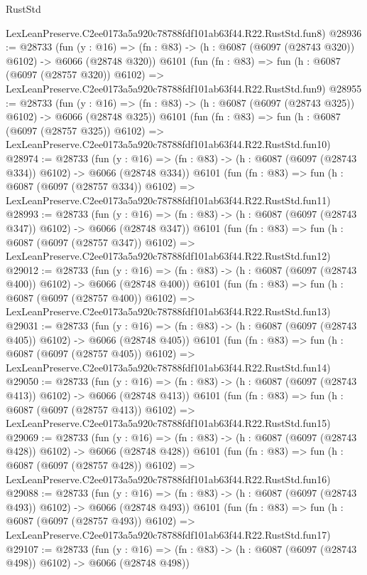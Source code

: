 \begin{lexlean}{RustStd}
\begin{coremodule}
    LexLeanPreserve.C2ee0173a5a920c78788fdf101ab63f44.R22.RustStd.fun8)
@28936 := @28733
    (fun (y : @16) => (fn : @83) -> (h : @6087 (@6097 (@28743 @320)) @6102) -> @6066 (@28748 @320))
    @6101
    (fun (fn : @83) =>
    fun (h : @6087 (@6097 (@28757 @320)) @6102) =>
    LexLeanPreserve.C2ee0173a5a920c78788fdf101ab63f44.R22.RustStd.fun9)
@28955 := @28733
    (fun (y : @16) => (fn : @83) -> (h : @6087 (@6097 (@28743 @325)) @6102) -> @6066 (@28748 @325))
    @6101
    (fun (fn : @83) =>
    fun (h : @6087 (@6097 (@28757 @325)) @6102) =>
    LexLeanPreserve.C2ee0173a5a920c78788fdf101ab63f44.R22.RustStd.fun10)
@28974 := @28733
    (fun (y : @16) => (fn : @83) -> (h : @6087 (@6097 (@28743 @334)) @6102) -> @6066 (@28748 @334))
    @6101
    (fun (fn : @83) =>
    fun (h : @6087 (@6097 (@28757 @334)) @6102) =>
    LexLeanPreserve.C2ee0173a5a920c78788fdf101ab63f44.R22.RustStd.fun11)
@28993 := @28733
    (fun (y : @16) => (fn : @83) -> (h : @6087 (@6097 (@28743 @347)) @6102) -> @6066 (@28748 @347))
    @6101
    (fun (fn : @83) =>
    fun (h : @6087 (@6097 (@28757 @347)) @6102) =>
    LexLeanPreserve.C2ee0173a5a920c78788fdf101ab63f44.R22.RustStd.fun12)
@29012 := @28733
    (fun (y : @16) => (fn : @83) -> (h : @6087 (@6097 (@28743 @400)) @6102) -> @6066 (@28748 @400))
    @6101
    (fun (fn : @83) =>
    fun (h : @6087 (@6097 (@28757 @400)) @6102) =>
    LexLeanPreserve.C2ee0173a5a920c78788fdf101ab63f44.R22.RustStd.fun13)
@29031 := @28733
    (fun (y : @16) => (fn : @83) -> (h : @6087 (@6097 (@28743 @405)) @6102) -> @6066 (@28748 @405))
    @6101
    (fun (fn : @83) =>
    fun (h : @6087 (@6097 (@28757 @405)) @6102) =>
    LexLeanPreserve.C2ee0173a5a920c78788fdf101ab63f44.R22.RustStd.fun14)
@29050 := @28733
    (fun (y : @16) => (fn : @83) -> (h : @6087 (@6097 (@28743 @413)) @6102) -> @6066 (@28748 @413))
    @6101
    (fun (fn : @83) =>
    fun (h : @6087 (@6097 (@28757 @413)) @6102) =>
    LexLeanPreserve.C2ee0173a5a920c78788fdf101ab63f44.R22.RustStd.fun15)
@29069 := @28733
    (fun (y : @16) => (fn : @83) -> (h : @6087 (@6097 (@28743 @428)) @6102) -> @6066 (@28748 @428))
    @6101
    (fun (fn : @83) =>
    fun (h : @6087 (@6097 (@28757 @428)) @6102) =>
    LexLeanPreserve.C2ee0173a5a920c78788fdf101ab63f44.R22.RustStd.fun16)
@29088 := @28733
    (fun (y : @16) => (fn : @83) -> (h : @6087 (@6097 (@28743 @493)) @6102) -> @6066 (@28748 @493))
    @6101
    (fun (fn : @83) =>
    fun (h : @6087 (@6097 (@28757 @493)) @6102) =>
    LexLeanPreserve.C2ee0173a5a920c78788fdf101ab63f44.R22.RustStd.fun17)
@29107 := @28733
    (fun (y : @16) => (fn : @83) -> (h : @6087 (@6097 (@28743 @498)) @6102) -> @6066 (@28748 @498))

\end{coremodule}
\end{lexlean}
